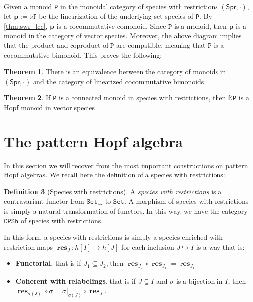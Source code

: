 \documentclass[12pt, reqno]{amsart}
\theoremstyle{definition}
\newtheorem{thm}{Theorem}[section]
\newtheorem{defin}[thm]{Definition}
\DeclareMathOperator{\rest}{\mathbf{res}}
\newcommand{\Spr}{\mathsf{Spr}} %
\newcommand{\prP}{\mathtt{P}}
\newcommand{\tp}{\mathbf{p}}
\begin{document}
\

Given a monoid $\prP$ in the monoidal category of species with restrictions $(\Spr, \cdot)$, let $\tp:=\mathbb{k}\prP$ be the linearization of the underlying set species of $\prP$. 
By \cref{thm:swr_lcc}, $\tp$ is a cocommutative comonoid. Since $\prP$ is a monoid, then $\tp$ is a monoid in the category of vector species. Moreover, the above diagram implies that the product and coproduct of $\prP$ are compatible, meaning that $\prP$ is a cocommutative bimonoid. 
This proves the following:

\begin{thm}
There is an equivalence between the category of monoids in $(\Spr, \cdot)$ and the category of linearized cocommutative bimonoids.
\end{thm}


\begin{thm}
If $\prP$ is a connected monoid in species with restrictions, then $\mathbb{K}\prP$ is a Hopf monoid in vector species
\end{thm}

\section{The pattern Hopf algebra \label{sec:pattern_algebra_contruction}}

In this section we will recover from \cite{Penaguiao2020} the most important constructions on pattern Hopf algebras.
We recall here the definition of a species with restrictions:

\begin{defin}[Species with restrictions]
A \textit{species with restrictions} is a contravariant functor from $\mathtt{Set}_{\hookrightarrow}$ to $\mathtt{Set}$.
A morphism of species with restrictions is simply a natural transformation of functors.
In this way, we have the category $\mathtt{CPSh}$ of species with restrictions.
\end{defin}

In this form, a species with restrictions is simply a species enriched with restriction maps $\rest_J : h[I] \to h[J] $ for each inclusion $J\hookrightarrow I$ is a way that is:
\begin{itemize}
\item \textbf{Functorial}, that is if $J_1\subseteq J_2$, then $\rest_{J_2} \circ \rest_{J_1} = \rest_{J_1}$

\item \textbf{Coherent with relabelings}, that is if $J\subseteq I$ and $\sigma $ is a bijection in $I$, then $\rest_{\sigma(J)} \circ \sigma = \sigma|_{\sigma(J)} \circ \rest_J$.
\end{itemize}
\end{document}
